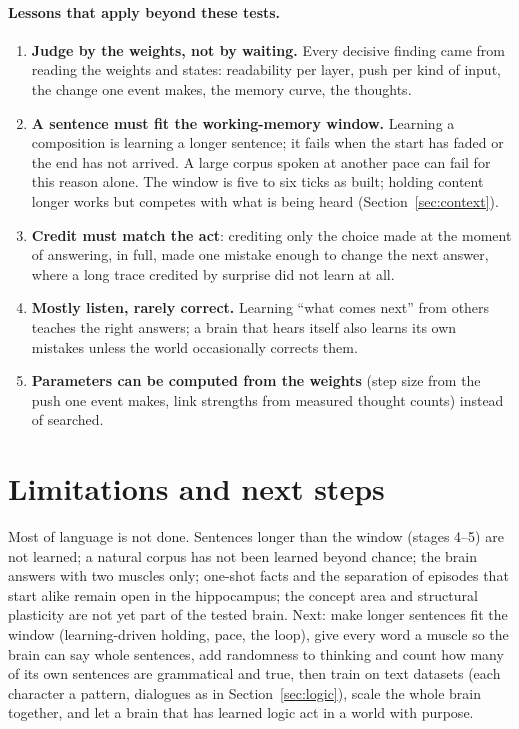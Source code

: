 \documentclass[11pt]{article}
\begin{document}
\paragraph{Lessons that apply beyond these tests.}
\begin{enumerate}
\item \textbf{Judge by the weights, not by waiting.} Every decisive finding came from reading the weights and states:
readability per layer, push per kind of input, the change one event makes, the memory curve, the thoughts.
\item \textbf{A sentence must fit the working-memory window.} Learning a composition is learning a longer sentence; it
fails when the start has faded or the end has not arrived. A large corpus spoken at another pace can fail for this reason
alone. The window is five to six ticks as built; holding content longer works but competes with what is being heard
(Section~\ref{sec:context}).
\item \textbf{Credit must match the act}: crediting only the choice made at the moment of answering, in full, made one
mistake enough to change the next answer, where a long trace credited by surprise did not learn at all.
\item \textbf{Mostly listen, rarely correct.} Learning ``what comes next'' from others teaches the right answers; a
brain that hears itself also learns its own mistakes unless the world occasionally corrects them.
\item \textbf{Parameters can be computed from the weights} (step size from the push one event makes, link strengths from
measured thought counts) instead of searched.
\end{enumerate}

\section{Limitations and next steps}
Most of language is not done. Sentences longer than the window (stages 4--5) are not learned; a natural corpus has not
been learned beyond chance; the brain answers with two muscles only; one-shot facts and the separation of episodes that
start alike remain open in the hippocampus; the concept area and structural plasticity are not yet part of the tested
brain. Next: make longer sentences fit the window (learning-driven holding, pace, the loop), give
every word a muscle so the brain can say whole sentences, add randomness to thinking and count how many of its own
sentences are grammatical and true, then train on text datasets (each character a pattern, dialogues as in
Section~\ref{sec:logic}), scale the whole brain together, and let a brain that has learned logic act in a world with purpose.
\end{document}
